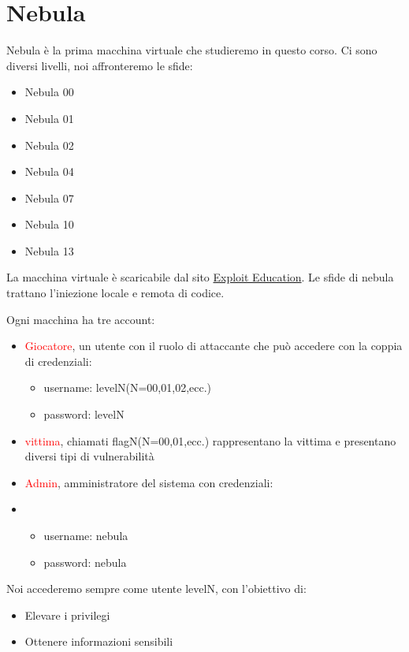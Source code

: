 \chapter{Nebula}
Nebula è la prima macchina virtuale che studieremo in questo corso. Ci sono diversi livelli, noi affronteremo le sfide:
\begin{itemize}
    \item Nebula 00
    \item Nebula 01
    \item Nebula 02
    \item Nebula 04
    \item Nebula 07
    \item Nebula 10
    \item Nebula 13
\end{itemize}
La macchina virtuale è scaricabile dal sito \href{https://exploit.education/}{Exploit Education}.
Le sfide di nebula trattano l'iniezione locale e remota di codice.

Ogni macchina ha tre account:
\begin{itemize}
    \item \textcolor{red}{Giocatore}, un utente con il ruolo di attaccante che può accedere con la coppia di credenziali:
    \begin{itemize}
        \item username: levelN(N=00,01,02,ecc.)
        \item password: levelN
    \end{itemize}
    \item \textcolor{red}{vittima}, chiamati flagN(N=00,01,ecc.) rappresentano la vittima e presentano diversi tipi di vulnerabilità
    \item \textcolor{red}{Admin}, amministratore del sistema con credenziali:
    \item \begin{itemize}
        \item username: nebula
        \item password: nebula
    \end{itemize}
\end{itemize}

Noi accederemo sempre come utente levelN, con l'obiettivo di:
\begin{itemize}
    \item Elevare i privilegi
    \item Ottenere informazioni sensibili
\end{itemize}

